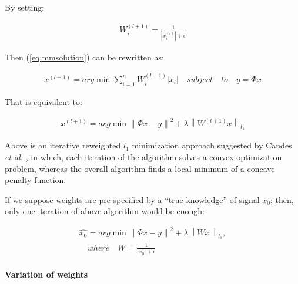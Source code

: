 By setting:

\begin{equation}
\begin{gathered}
W_{i}^{\left ( l+1 \right )}  = \frac{1}{\left | x_{i}^{\left ( l \right )} \right |+\epsilon }
\end{gathered}
\end{equation}

Then (\ref{eq:mmsolution}) can be rewritten as:

\begin{equation}
\begin{gathered}
x^{\left ( l+1 \right )} = arg \min \sum_{i=1}^{n} W_{i}^{\left ( l+1 \right )} \left | x_{i} \right |
\quad subject \quad to \quad y=\Phi x
\end{gathered}
\end{equation}

That is equivalent to:

\begin{equation}
\begin{gathered}
x^{\left ( l+1 \right )} = arg \min \left \| \Phi x-y \right \|^{2} + \lambda \left \| W^{\left ( l+1 \right )} x \right \|_{l_{1}}
\end{gathered}
\end{equation}

Above is an iterative reweighted $l_{1}$ minimization approach suggested by Candes \emph{et al.} \cite{candes2008enhancing}, in which, each iteration of the algorithm solves a convex optimization problem, whereas the overall algorithm finds a local minimum of a concave penalty function.

If we suppose weights are pre-specified by a ``true knowledge'' of signal $x_{0}$; then, only one iteration of above algorithm would be enough:

\begin{equation}
\label{eq:firstWeightingSolution}
\begin{gathered}
\hat{x_{0}} = arg \min \left \| \Phi x-y \right \|^{2} + \lambda \left \| Wx \right \|_{l_{1}}, \\
\quad where \quad W = \frac{1}{\left | x_{0} \right |+\epsilon }
\end{gathered}
\end{equation}

\paragraph{Variation of weights} %

